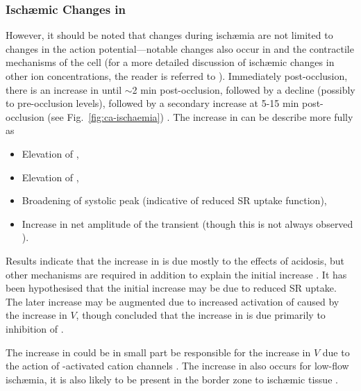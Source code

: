 \documentclass[../thesis-main.tex]{subfiles}
\begin{document}
\subsubsection{Isch\ae{}mic Changes in \cai{}}
\label{subsubsec:isch-ca}
However, it should be noted that changes during isch\ae{}mia are not limited to changes in the action potential---notable changes also occur in \cai{} and the contractile mechanisms of the cell (for a more detailed discussion of isch\ae{}mic changes in other ion concentrations, the reader is referred to \citet{Carmeliet1999, Niederer2013}). Immediately post-occlusion, there is an increase in \cai{} until $\sim$2 min post-occlusion, followed by a decline (possibly to pre-occlusion levels), followed by a secondary increase at 5-15 min post-occlusion (see Fig.~\ref{fig:ca-ischaemia}) \citep{Lee1988, Mohabir1991, Camacho1993}. The increase in \cai{} can be describe more fully as
\begin{itemize}
 \item Elevation of \casys{},
 \item Elevation of \cadia{},
 \item Broadening of systolic \ca{} peak (indicative of reduced SR uptake function),
 \item Increase in net amplitude of the \ca{} transient (though this is not always observed \citep{Camacho1993}).
\end{itemize}
Results indicate that the increase in \cai{} is due mostly to the effects of acidosis, but other mechanisms are required in addition to explain the initial increase \citep{Bers1982, Mohabir1991}. It has been hypothesised that the initial increase may be due to reduced SR uptake. The later increase may be augmented due to increased activation of \ica{} caused by the increase in $V$, though \citet{Niederer2013} concluded that the increase in \cadia{} is due primarily to inhibition of \inak{}.

The increase in \cai{} could be in small part be responsible for the increase in $V$ due to the action of \ca{}-activated cation channels \citep{Colquhoun1981}. The increase in \cai{} also occurs for low-flow isch\ae{}mia, \idest{} it is also likely to be present in the border zone to isch\ae{}mic tissue \citep{Camacho1993}.
\end{document}
